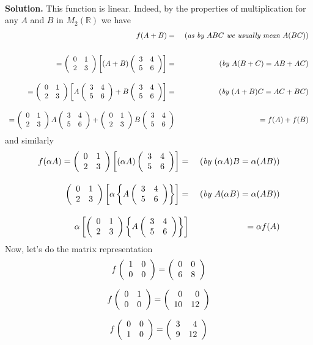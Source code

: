 \documentclass[12pt]{article} %
\begin{document}
\begin{enumerate}
	\\\textbf{Solution.} 
	This function is linear. Indeed, by the properties of multiplication for any $A$ and $B$ in $M_2(\mathbb{R})$ we have
	\[\begin{array}{rr}f(A+B)=&\mbox{ (\textit{as by $ABC$ we usually mean $A(BC)$})}\\[2em]
	=\left(\begin{array}{rr}0&1\\2&3\end{array}\right)\left[(A+B)\left(\begin{array}{rr}3&4\\5&6\end{array}\right)\right]=&\mbox{ (\textit{by $A(B+C)=AB+AC$})}\\[2em]
	=\left(\begin{array}{rr}0&1\\2&3\end{array}\right)\left[A\left(\begin{array}{rr}3&4\\5&6\end{array}\right)+B\left(\begin{array}{rr}3&4\\5&6\end{array}\right)\right]=&\mbox{ (\textit{by $(A+B)C=AC+BC$})}\\[2em]
	=\left(\begin{array}{rr}0&1\\2&3\end{array}\right)A\left(\begin{array}{rr}3&4\\5&6\end{array}\right)+\left(\begin{array}{rr}0&1\\2&3\end{array}\right)B\left(\begin{array}{rr}3&4\\5&6\end{array}\right)&=
	f(A)+f(B)\end{array}\]
	and similarly
	\[\begin{array}{rr}
	f(\alpha A)=\left(\begin{array}{rr}0&1\\2&3\end{array}\right)\left[(\alpha A)\left(\begin{array}{rr}3&4\\5&6\end{array}\right)\right]=&\mbox{ (\textit{by $(\alpha A)B=\alpha(AB)$})}\\[2em]
	\left(\begin{array}{rr}0&1\\2&3\end{array}\right)\left[\alpha \left\{A\left(\begin{array}{rr}3&4\\5&6\end{array}\right)\right\}\right]=&\mbox{ (\textit{by $A(\alpha B)=\alpha(AB)$})}\\[2em]
	\alpha\left[\left(\begin{array}{rr}0&1\\2&3\end{array}\right){\left\{A\left(\begin{array}{rr}3&4\\5&6\end{array}\right)\right\}}\right]&=\alpha f(A)
	\end{array}\]
	Now, let's do the matrix representation
	\[f\left(\begin{array}{rr}1&0\\0&0\end{array}\right)=
	\left(\begin{array}{rr}
	0&0\\
	6&8\\\end{array}\right)\]

	\[f\left(\begin{array}{rr}0&1\\0&0\end{array}\right)=
\left(\begin{array}{rr}
0&0\\
10&12\\
\end{array}\right)\]

	\[f\left(\begin{array}{rr}0&0\\1&0\end{array}\right)=
\left(\begin{array}{rr}
3&4\\
9&12\\
\end{array}\right)\]


\end{enumerate}
\end{document}
